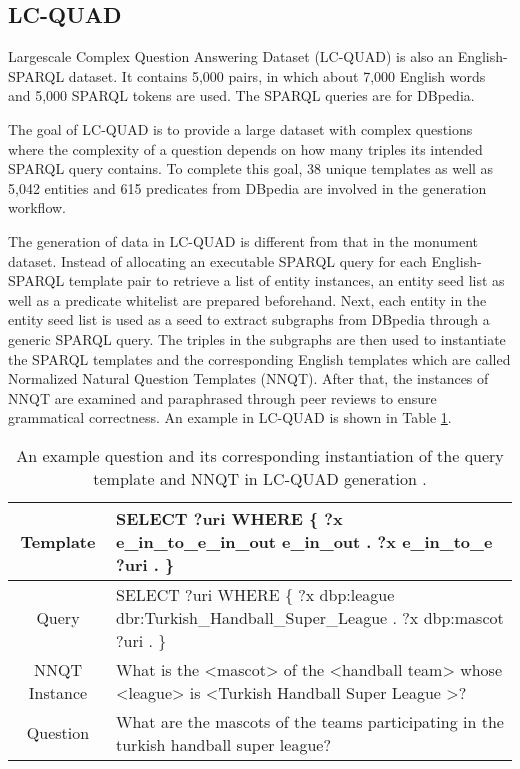 \subsection{LC-QUAD} \label{subsection:lc-quad}

Largescale Complex Question Answering Dataset (LC-QUAD) \cite{trivedi2017lc} is also an English-SPARQL dataset. It contains 5,000 pairs, in which about 7,000 English words and 5,000 SPARQL tokens are used. The SPARQL queries are for DBpedia. 

The goal of LC-QUAD is to provide a large dataset with complex questions where the complexity of a question depends on how many triples its intended SPARQL query contains. To complete this goal, 38 unique templates as well as 5,042 entities and 615 predicates from DBpedia are involved in the generation workflow.

The generation of data in LC-QUAD is different from that in the monument dataset. Instead of allocating an executable SPARQL query for each English-SPARQL template pair to retrieve a list of entity instances, an entity seed list as well as a predicate whitelist are prepared beforehand. Next, each entity in the entity seed list is used as a seed to extract subgraphs from DBpedia through a generic SPARQL query. The triples in the subgraphs are then used to instantiate the SPARQL templates and the corresponding English templates which are called Normalized Natural Question Templates (NNQT). After that, the instances of NNQT are examined and paraphrased through peer reviews to ensure grammatical correctness. An example in LC-QUAD is shown in Table \ref{table:lc-quad generation}.

\begin{table}[h]
\centering
\label{table:lc-quad generation}
\caption{An example question and its corresponding instantiation of the query template and NNQT in LC-QUAD generation \cite{trivedi2017lc}.}
\begin{tabular}{c p{12cm}}
Template & SELECT ?uri WHERE \{ ?x e\_in\_to\_e\_in\_out e\_in\_out . ?x e\_in\_to\_e ?uri . \} \\
\hline
Query & SELECT ?uri WHERE \{ ?x dbp:league dbr:Turkish\_Handball\_Super\_League . ?x dbp:mascot ?uri . \} \\
\hline
NNQT Instance & What is the <mascot> of the <handball team> whose <league> is <Turkish Handball Super League >? \\
\hline
Question & What are the mascots of the teams participating in the turkish handball
super league? \\
\end{tabular}
\end{table}

